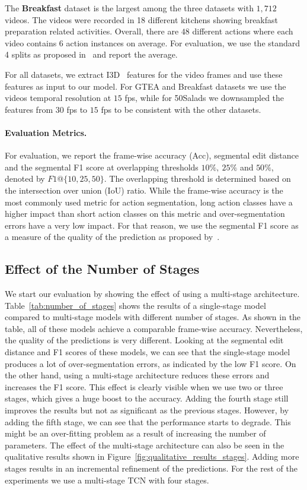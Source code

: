 \documentclass[10pt,twocolumn,letterpaper]{article}
\begin{document}
The \textbf{Breakfast} dataset is the largest among the three datasets with 
$1,712$ videos. The videos were recorded in 18 different kitchens showing 
breakfast preparation related activities. Overall, there are $48$ different 
actions where each video contains $6$ action instances on average. For evaluation, 
we use the standard 4 splits as proposed in~\cite{kuehne2014language} and report 
the average.

For all datasets, we extract I3D~\cite{carreira2017quo} features for the video  
frames and use these features as input to our model. For GTEA and Breakfast datasets
we use the videos temporal resolution at $15$ fps, while for 50Salads we downsampled 
the features from $30$ fps to $15$ fps to be consistent with the other datasets.

\paragraph{Evaluation Metrics.} For evaluation, we report the frame-wise 
accuracy (Acc), segmental edit distance and the segmental F1 score at overlapping 
thresholds $10\%,\ 25\%$ and $50\%$, denoted by $F1$@$\{10,25,50\}$. The overlapping 
threshold is determined based on the intersection over union (IoU) ratio. While the 
frame-wise accuracy is the most commonly used metric for action segmentation, long 
action classes have a higher impact than short action classes on this metric and 
over-segmentation errors have a very low impact. For that reason, we use the segmental 
F1 score as a measure of the quality of the prediction as proposed by~\cite{Lea_2017_CVPR}.



\subsection{Effect of the Number of Stages}

We start our evaluation by showing the effect of using a multi-stage 
architecture. Table~\ref{tab:number_of_stages} shows the results of a 
single-stage model compared to multi-stage models with different 
number of stages. As shown in the table, all of these models achieve 
a comparable frame-wise accuracy. Nevertheless, the quality of the 
predictions is very different. Looking at the segmental edit distance 
and F1 scores of these models, we can see that the single-stage model 
produces a lot of over-segmentation errors, as indicated by the 
low F1 score. On the other hand, using a multi-stage architecture 
reduces these errors and increases the F1 score. This effect is 
clearly visible when we use two or three stages, which gives a huge 
boost to the accuracy. Adding the fourth stage still improves the 
results but not as significant as the previous stages. However, 
by adding the fifth stage, we can see that the performance starts 
to degrade. This might be an over-fitting problem as a result of 
increasing the number of parameters. The effect of the multi-stage 
architecture can also be seen in the qualitative results shown
in Figure~\ref{fig:qualitative_results_stages}. Adding more stages 
results in an incremental refinement of the predictions. For the rest 
of the experiments we use a multi-stage TCN with four stages.
\end{document}
